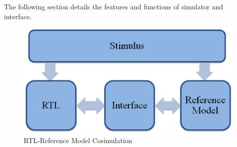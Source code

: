 The following section details the features and functions of simulator and interface. 



\begin{figure}[H]
\centering
\includegraphics[width=4.5in]{./figures/interface.eps}
\caption{RTL-Reference Model Cosimulation} 
\label{fig:interface.eps}
\end{figure}





